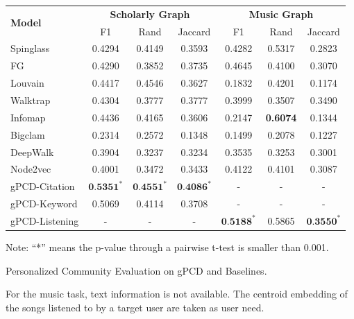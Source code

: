 \begin{threeparttable}
	 \centering
	
	\begin{tabular}{lcccccc} 
		\toprule   
		\multirow{2}{*}{\textbf{Model}} & \multicolumn{3}{c}{\textbf{Scholarly Graph}} 	&\multicolumn{3}{c}{\textbf{Music Graph}}\\
		\cmidrule(lr){2-7}
		& F1 & Rand	& Jaccard	& F1 & Rand	& Jaccard\\ \midrule
		Spinglass&0.4294 & 0.4149 &0.3593 & 0.4282 & 0.5317& 0.2823 \\ \midrule
		FG& 0.4290 & 0.3852& 0.3735 &0.4645&0.4100& 0.3070 \\ \midrule
		Louvain&0.4417 & 0.4546& 0.3627&0.1832 &0.4201 & 0.1174 \\ \midrule
		Walktrap& 0.4304 & 0.3777 & 0.3777&0.3999 & 0.3507& 0.3490 \\ \midrule
		Infomap&0.4436 & 0.4165& 0.3606& 0.2147 & \textbf{0.6074} &0.1344\\ \midrule
		Bigclam& 0.2314  & 0.2572 & 0.1348 & 0.1499  & 0.2078  & 0.1227 \\ \midrule
		DeepWalk&0.3904 & 0.3237 & 0.3234&0.3535& 0.3253& 0.3001 \\ \midrule
		Node2vec & 0.4001 & 0.3472 & 0.3433&0.4122 & 0.4101& 0.3087 \\ \midrule
		gPCD-Citation&$\textbf{0.5351}^{*}$ & $\textbf{0.4551}^{*}$& $\textbf{0.4086}^{*}$ &-	&-	& -\\ \midrule
		gPCD-Keyword&0.5069 & 0.4114& 0.3708 &-	&-	& - \\ \midrule
		gPCD-Listening&-	&-	& - &$\textbf{0.5188}^{*} $& 0.5865& $\textbf{0.3550}^{*} $\\ 
		\bottomrule
	\end{tabular}
	\begin{tablenotes}
		\item[] \begin{footnotesize}
			Note: ``*'' means the p-value through a pairwise t-test is smaller than 0.001.
		\end{footnotesize}
	\end{tablenotes}
	\caption{Personalized Community Evaluation on gPCD and Baselines. }
	\label{tab:community}
\end{threeparttable}

For the music task, text information is not available. The centroid embedding of the songs listened to by a target user are taken as user need.

